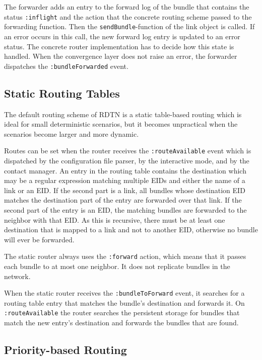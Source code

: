 \documentclass{article}
\begin{document}
The forwarder adds an entry to the forward log of the bundle that contains the
status {\tt :inflight} and the action that the concrete routing scheme passed to
the forwarding function. Then the {\tt sendBundle}-function of the link object
is called. If an error occurs in this call, the new forward log entry is updated
to an error status. The concrete router implementation has to decide how this
state is handled. When the convergence layer does not raise an error, the
forwarder dispatches the {\tt :bundleForwarded} event.

\subsection{Static Routing Tables}\label{sec.static-routing}

The default routing scheme of RDTN is a static table-based routing which is
ideal for small deterministic scenarios, but it becomes unpractical when the
scenarios become larger and more dynamic.

Routes can be set when the router receives the {\tt :routeAvailable} event which
is dispatched by the configuration file parser, by the interactive mode, and by
the contact manager.  An entry in the routing table contains the destination
which may be a regular expression matching multiple EIDs and either the name of
a link or an EID. If the second part is a link, all bundles whose destination
EID matches the destination part of the entry are forwarded over that link. If
the second part of the entry is an EID, the matching bundles are forwarded to
the neighbor with that EID. As this is recursive, there must be at least one
destination that is mapped to a link and not to another EID, otherwise no bundle
will ever be forwarded.

The static router always uses the {\tt :forward} action, which means that it
passes each bundle to at most one neighbor. It does not replicate bundles in the
network.

When the static router receives the {\tt :bundleToForward} event, it searches
for a routing table entry that matches the bundle's destination and forwards it.
On {\tt :routeAvailable} the router searches the persistent storage for bundles
that match the new entry's destination and forwards the bundles that are found.

\subsection{Priority-based Routing}\label{sec.prio-routing}
\end{document}
